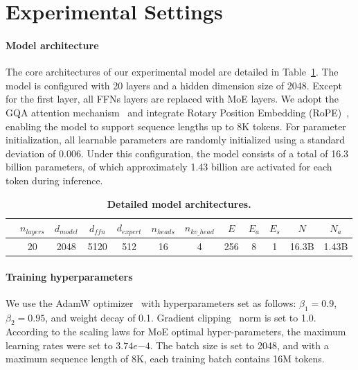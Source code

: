 \appendix


\section{Experimental Settings}
\label{setup}

\paragraph{Model architecture}
The core architectures of our experimental model are detailed in Table~\ref{table:Architectures}. 
The model is configured with 20 layers and a hidden dimension size of 2048. Except for the first layer, all FFNs layers are replaced with MoE layers. We adopt the GQA attention mechanism~\citep{gqa} and integrate Rotary Position Embedding (RoPE)~\citep{rope}, enabling the model to support sequence lengths up to 8K tokens. For parameter initialization, all learnable parameters are randomly initialized using a standard deviation of 0.006. 
Under this configuration, the model consists of a total of 16.3 billion parameters, of which approximately 1.43 billion are activated for each token during inference.

\begin{table}[h]
  \small
  \caption{{\textbf{Detailed model architectures.}}}
  \label{table:Architectures}
  \centering
  \setlength{\tabcolsep}{5pt} %
  \begin{tabular}{cccccccccccc}
    \toprule
      & $n_{layers}$ & $d_{model}$ & $d_{ffn}$ & $d_{expert}$ &$n_{heads}$ & $n_{kv\_head}$ & $E$ & $E_a$ & $E_s$ & $N$ & $N_a$ \\
    \midrule
      & 20 & 2048 & 5120 & 512 & 16 & 4 & 256 & 8 & 1 & 16.3B & 1.43B \\
    \bottomrule
  \end{tabular}
\end{table}

\paragraph{Training hyperparameters}
We use the AdamW optimizer~\citep{adamw} with hyperparameters set as follows: $\beta_1 = 0.9$, $\beta_2 = 0.95$, and weight decay of 0.1. Gradient clipping~\citep{clipping} norm is set to 1.0. According to the scaling laws for MoE optimal hyper-parameters, the maximum learning rates were set to $3.74e{-4}$. The batch size is set to 2048, and with a maximum sequence length of 8K, each training batch contains 16M tokens.

